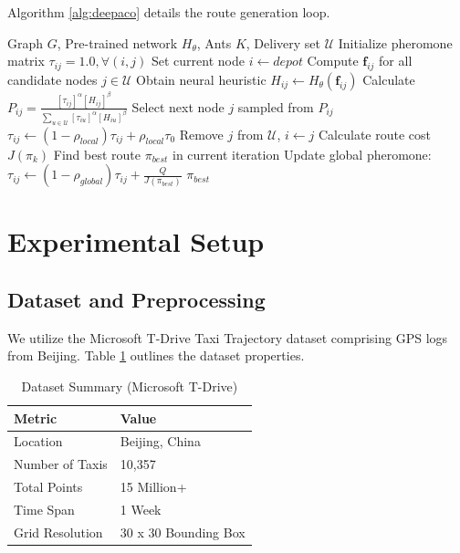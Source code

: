 \documentclass[conference]{IEEEtran}
\begin{document}
Algorithm \ref{alg:deepaco} details the route generation loop.

\begin{algorithm}
\caption{DeepACO Inference Algorithm}
\label{alg:deepaco}
\begin{algorithmic}[1]
\REQUIRE Graph $G$, Pre-trained network $H_{\theta}$, Ants $K$, Delivery set $\mathcal{U}$
\STATE Initialize pheromone matrix $\tau_{ij} = 1.0, \forall (i,j)$
        \STATE Set current node $i \leftarrow depot$
            \STATE Compute $\mathbf{f}_{ij}$ for all candidate nodes $j \in \mathcal{U}$
            \STATE Obtain neural heuristic $H_{ij} \leftarrow H_{\theta}(\mathbf{f}_{ij})$
            \STATE Calculate $P_{ij} = \frac{[\tau_{ij}]^\alpha [H_{ij}]^\beta}{\sum_{u \in \mathcal{U}} [\tau_{iu}]^\alpha [H_{iu}]^\beta}$
            \STATE Select next node $j$ sampled from $P_{ij}$
            \STATE $\tau_{ij} \leftarrow (1 - \rho_{local}) \tau_{ij} + \rho_{local} \tau_{0}$
            \STATE Remove $j$ from $\mathcal{U}$, $i \leftarrow j$
        \ENDWHILE
        \STATE Calculate route cost $J(\pi_k)$
    \ENDFOR
    \STATE Find best route $\pi_{best}$ in current iteration
    \STATE Update global pheromone: $\tau_{ij} \leftarrow (1 - \rho_{global}) \tau_{ij} + \frac{Q}{J(\pi_{best})}$
\ENDFOR
\RETURN $\pi_{best}$
\end{algorithmic}
\end{algorithm}

\section{Experimental Setup}
\label{sec:experimental_setup}

\subsection{Dataset and Preprocessing}
We utilize the Microsoft T-Drive Taxi Trajectory dataset \cite{tdrive} comprising GPS logs from Beijing. Table \ref{tab:dataset} outlines the dataset properties.

\begin{table}[htbp]
\centering
\caption{Dataset Summary (Microsoft T-Drive)}
\label{tab:dataset}
\begin{tabular}{@{}ll@{}}
\toprule
\textbf{Metric} & \textbf{Value} \\ \midrule
Location & Beijing, China \\
Number of Taxis & 10,357 \\
Total Points & 15 Million+ \\
Time Span & 1 Week \\
Grid Resolution & 30 x 30 Bounding Box \\ \bottomrule
\end{tabular}
\end{table}
\end{document}

